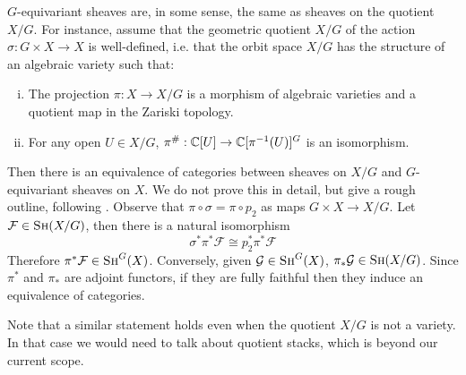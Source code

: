 \begin{remark}
$G$-equivariant sheaves are, in some sense, the same as sheaves on the quotient $X/G$. For instance, assume that the 
geometric quotient $X/G$ of the action $\sigma : G\times X \to X$ is well-defined, i.e. that
the orbit space $X/G$ has the structure of an algebraic variety such that:
\begin{enumerate}[(i)]
\item The projection $\pi : X \to X/G$ is a morphism of algebraic varieties and a quotient map in the Zariski topology.
\item For any open $U \in X/G$, $\pi^{\#} : \mathbb{C}[U] \to \mathbb{C}[\pi^{-1}(U)]^G$ is an isomorphism.
\end{enumerate}
Then there is an equivalence of categories between sheaves on $X/G$ and $G$-equivariant sheaves on $X$. We do not
prove this in detail, but give a rough outline, following . Observe that $\pi \circ
\sigma = \pi \circ p_2$ as maps $G\times X \to X/G$. Let $\mathcal{F} \in \textsc{Sh}(X/G)$, then there is a natural
isomorphism
\[	\sigma^* \pi^* \mathcal{F} \cong p_2^* \pi^* \mathcal{F} \]
Therefore $\pi^* \mathcal{F} \in \textsc{Sh}^G(X)$. Conversely, given $\mathcal{G} \in \textsc{Sh}^G(X)$, $\pi_* 
\mathcal{G} \in \textsc{Sh}(X/G)$. Since $\pi^*$ and $\pi_*$ are adjoint functors, if they are fully faithful then they
induce an equivalence of categories. 

Note that a similar statement holds even when the quotient $X/G$ is not a variety. In that case we would need to talk
about quotient stacks, which is beyond our current scope.
\end{remark}


